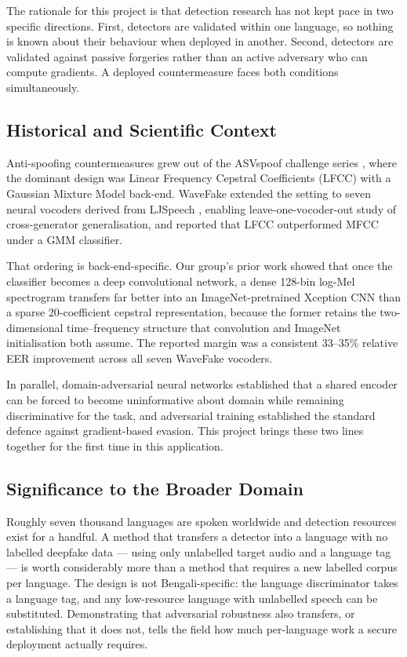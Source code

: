 \documentclass[conference]{IEEEtran}
\renewcommand{\cite}[1]{\unskip}
\begin{document}
The rationale for this project is that detection research has not kept pace in
two specific directions. First, detectors are validated within one language,
so nothing is known about their behaviour when deployed in another. Second,
detectors are validated against passive forgeries rather than an active
adversary who can compute gradients. A deployed countermeasure faces both
conditions simultaneously.

\subsection{Historical and Scientific Context}
Anti-spoofing countermeasures grew out of the ASVspoof challenge series
\cite{todisco2019asvspoof}, where the dominant design was Linear Frequency
Cepstral Coefficients (LFCC) with a Gaussian Mixture Model back-end. WaveFake
\cite{frank2021wavefake} extended the setting to seven neural vocoders derived
from LJSpeech \cite{ito2017ljspeech}, enabling leave-one-vocoder-out study of
cross-generator generalisation, and reported that LFCC outperformed MFCC under
a GMM classifier.

That ordering is back-end-specific. Our group's prior work
\cite{ahmed2026melspec} showed that once the classifier becomes a deep
convolutional network, a dense 128-bin log-Mel spectrogram transfers far
better into an ImageNet-pretrained Xception CNN \cite{chollet2017xception}
than a sparse 20-coefficient cepstral representation, because the former
retains the two-dimensional time--frequency structure that convolution and
ImageNet initialisation both assume. The reported margin was a consistent
33--35\% relative EER improvement across all seven WaveFake vocoders.

In parallel, domain-adversarial neural networks \cite{ganin2016dann}
established that a shared encoder can be forced to become uninformative about
domain while remaining discriminative for the task, and adversarial training
\cite{goodfellow2015fgsm,madry2018pgd} established the standard defence
against gradient-based evasion. This project brings these two lines together
for the first time in this application.

\subsection{Significance to the Broader Domain}
Roughly seven thousand languages are spoken worldwide and detection resources
exist for a handful. A method that transfers a detector into a language with
no labelled deepfake data --- using only unlabelled target audio and a
language tag --- is worth considerably more than a method that requires a new
labelled corpus per language. The design is not Bengali-specific: the language
discriminator takes a language tag, and any low-resource language with
unlabelled speech can be substituted. Demonstrating that adversarial
robustness also transfers, or establishing that it does not, tells the field
how much per-language work a secure deployment actually requires.
\end{document}
